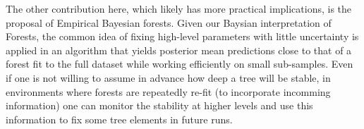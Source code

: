 \documentclass{article}
\begin{document}
The other contribution here, which likely has more practical
implications, is the proposal of Empirical Bayesian forests. Given our
Baysian interpretation of Forests, the common idea of fixing high-level
parameters with little uncertainty is applied in an algorithm that
yields posterior mean predictions close to that of a forest fit to the
full dataset while working efficiently on small sub-samples. Even if one
is not willing to assume in advance how deep a tree will be stable, in
environments where forests are repeatedly re-fit (to incorporate
incomming information) one can monitor the stability at higher levels
and use this information to fix some tree elements in future runs.



\end{document}
